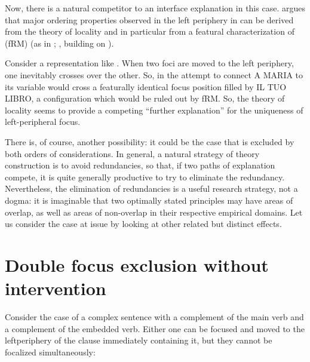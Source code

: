 \documentclass[output=paper]{LSP/langsci}
\begin{document}
Now, there is a natural competitor to an interface explanation in this case.  \citet{Abels2012} argues that major ordering properties observed in the left periphery in \citet{Rizzi1997,Rizzi2001} can be derived from the theory of locality and in particular from a featural characterization of  (fRM) (as in \citealt{Starke2001}; \citealt{Rizzi2004}, building on \citealt{Rizzi1990minimality}).

Consider a representation like . When two foci are moved to the left periphery, one inevitably crosses over the other. So, in  the attempt to connect A MARIA to its variable would cross a featurally identical focus position filled by IL TUO LIBRO, a configuration which would be ruled out by fRM. So, the theory of locality seems to provide a competing “further explanation” for the uniqueness of left-peripheral focus.

There is, of course, another possibility:  it could be the case that  is excluded by both orders of considerations. In general, a natural strategy of theory construction is to avoid redundancies, so that, if two paths of explanation compete, it is quite generally productive to try to eliminate the redundancy. Nevertheless, the elimination of redundancies is a useful research strategy, not a dogma: it is imaginable that two optimally stated principles may have areas of overlap, as well as areas of non-overlap in their respective empirical domains. Let us consider the case at issue by looking at other related but distinct effects.
 
\section{Double focus exclusion without intervention}


Consider the case of a complex sentence with a complement of the main verb and a complement of the embedded verb. Either one can be focused and moved to the left\largerpage periphery of the clause immediately containing it, but they cannot be focalized simultaneously:

\ea%
    \label{ex:rizzi:6}

\end{document}
